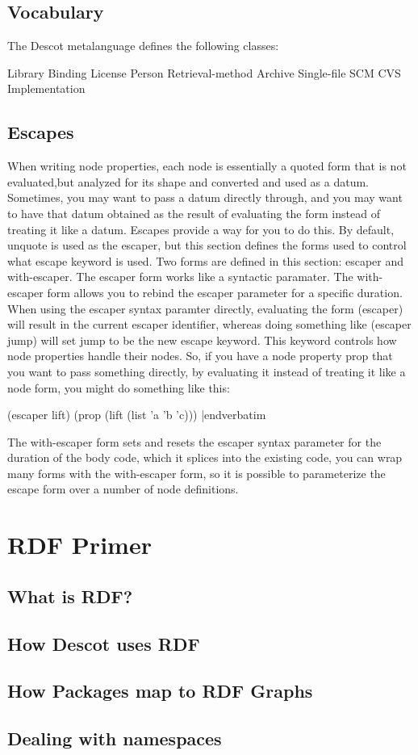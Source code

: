 \section{Vocabulary}{}%
The Descot metalanguage defines the following classes:

\unorderedlist
\li Library
\li Binding
\li License
\li Person
\li Retrieval-method
\li Archive
\li Single-file
\li SCM
\li CVS
\li Implementation
\endunorderedlist

\section{Escapes}{}%
When writing node properties, each node is essentially a quoted form 
that is not evaluated,but analyzed for its shape and converted and 
used as a datum. Sometimes, you may want to pass a datum directly through, 
and you may want to have that datum obtained as the result of evaluating
the form instead of treating it like a datum. Escapes provide a way for 
you to do this. By default, unquote is used as the escaper, but this 
section defines the forms used to control what escape keyword is used.
Two forms are defined in this section: escaper and with-escaper. 
The escaper form works like a syntactic paramater. The with-escaper 
form allows you to rebind the escaper parameter for a specific
duration.
When using the escaper syntax paramter directly, evaluating the 
form (escaper) will result in the current escaper identifier, whereas 
doing something like (escaper jump) will set jump to be the new escape
keyword. This keyword controls how node properties handle their nodes. 
So, if you have a node property prop that you want to pass something 
directly, by evaluating it instead of treating it like a node form,
you might do something like this:

\medskip\verbatim
(escaper lift)
(prop (lift (list 'a 'b 'c)))
|endverbatim
\medskip

\noindent
The with-escaper form sets and resets the escaper syntax parameter
for the duration of the body code, which it splices into the existing 
code, you can wrap many forms with the with-escaper form, so it is 
possible to parameterize the escape form over a number of node definitions.

\chapter{RDF Primer}{}%
\section{What is RDF?}{}%
\section{How Descot uses RDF}{}%
\section{How Packages map to RDF Graphs}{}%
\section{Dealing with namespaces}{}%


\bye
